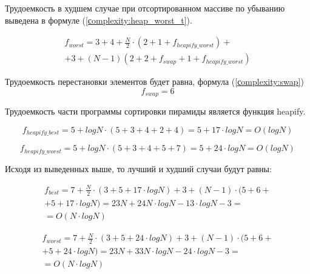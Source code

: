 Трудоемкость в худшем случае при отсортированном массиве по убыванию выведена в формуле (\ref{сomplexity:heap_worst_t}).

\begin{equation}
	\label{сomplexity:heap_worst_t}
	\begin{gathered}
		f_{worst} = 3 + 4 + \frac{N}{2} \cdot (2 + 1 + f_{heapify\_worst}) + \\
		+ 3 + (N - 1)(2 + 2 + f_{swap} + 1 + f_{heapify\_worst})
	\end{gathered}
\end{equation}

Трудоемкость перестановки элементов будет равна, формула (\ref{сomplexity:swap})
\begin{equation}
	\label{сomplexity:swap}
	f_{swap} = 6
\end{equation}

Трудоемкость части программы сортировки пирамиды является функция heapify.

\begin{equation}
	\label{сomplexity:heapify_best}
	f_{heapify\_best} = 5 + log N \cdot (5 + 3 + 4 + 2 + 4) = 5 + 17 \cdot log N = O(log N) 
\end{equation}

\begin{equation}
	\label{сomplexity:heapify_worst}
	f_{heapify\_worst} = 5 + log N \cdot (5 + 3 + 4 + 5 + 7) = 5 + 24 \cdot log N = O(log N) 
\end{equation}

Исходя из выведенных выше, то лучший и худший случаи будут равны: 

\begin{equation}
	\label{сomplexity:heap_best_p}
	\begin{gathered}
		f_{best} = 7 + \frac{N}{2} \cdot (3 + 5 + 17 \cdot log N) + 3 + (N - 1) \cdot (5 + 6 + \\ 
		+ 5 + 17 \cdot log N) = 23N + 24N \cdot log N - 13 \cdot log N - 3 =\\
		= O(N \cdot log N)
	\end{gathered}
\end{equation}

\begin{equation}
	\label{сomplexity:heap_worst_p}
	\begin{gathered}
		f_{worst} = 7 + \frac{N}{2} \cdot (3 + 5 + 24 \cdot log N) + 3 + (N - 1) \cdot (5 + 6 + \\ 
		+ 5 + 24 \cdot log N) = 23N + 33N \cdot log N - 24 \cdot log N - 3 =\\
		= O(N \cdot log N)
	\end{gathered}
\end{equation}

